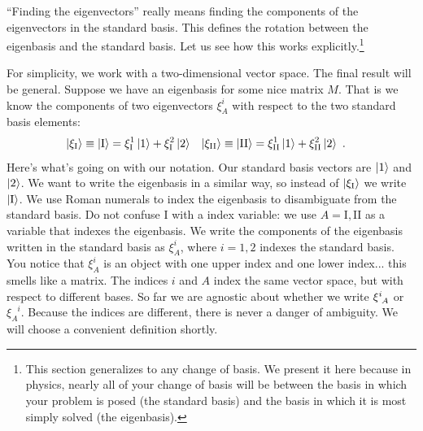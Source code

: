 \documentclass[12pt]{article}
\begin{document}
``Finding the eigenvectors'' really means finding the components of the eigenvectors in the standard basis. This defines the rotation between the eigenbasis and the standard basis. Let us see how this works explicitly.\footnote{This section generalizes to any change of basis. We present it here because in physics, nearly all of your change of basis will be between the basis in which your problem is posed (the standard basis) and the basis in which it is most simply solved (the eigenbasis).}

For simplicity, we work with a two-dimensional vector space. The final result will be general. Suppose we have an eigenbasis for some nice matrix $M$. That is we know the components of two eigenvectors $\xi^i_{A}$ with respect to the two standard basis elements:
\begin{align}
    \left|\xi_\textnormal{I}\right\rangle \equiv \left|\textnormal{I}\right\rangle 
    & = 
    \xi^1_\textnormal{I} \left|1\right\rangle
    +
    \xi^2_\textnormal{I} \left|2\right\rangle
    &
    \left|\xi_\textnormal{II}\right\rangle \equiv \left|\textnormal{II}\right\rangle 
    & = 
    \xi^1_\textnormal{II} \left|1\right\rangle
    +
    \xi^2_\textnormal{II} \left|2\right\rangle \ .
    \label{eq:eigen:to:standard:basis}
\end{align}
Here's what's going on with our notation. Our standard basis vectors are $\left|1\right\rangle$ and $\left|2\right\rangle$. We want to write the eigenbasis in a similar way, so instead of $\left|\xi_\textnormal{I}\right\rangle$ we write $\left|\textnormal{I}\right\rangle$. We use Roman numerals to index the eigenbasis to disambiguate from the standard basis. Do not confuse $\text{I}$ with a index variable: we use $A = \text{I}, \text{II}$ as a variable that indexes the eigenbasis. We write the components of the eigenbasis written in the standard basis as $\xi^i_A$, where $i=1,2$ indexes the standard basis. You notice that $\xi^i_A$ is an object with one upper index and one lower index... this smells like a matrix. The indices $i$ and $A$ index the same vector space, but with respect to different bases. So far we are agnostic about whether we write $\xi\aij{i}{A}$ or $\xi_A^{\phantom{A}i}$. Because the indices are different, there is never a danger of ambiguity. We will choose a convenient definition shortly.
\end{document}
